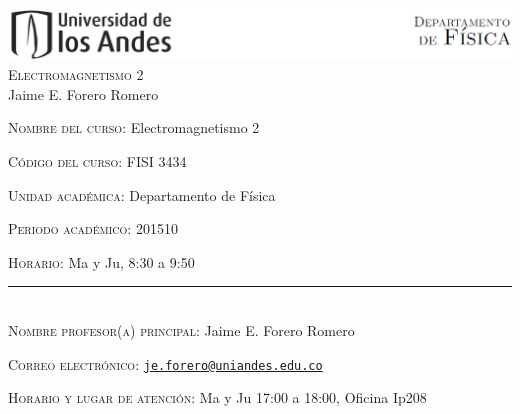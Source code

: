 \documentclass[letterpaper,10pt,onecolumn]{article}
\begin{document}
\begin{center}

\includegraphics[width=490pt]{header.png}\\[0.5cm]

\textsc{\LARGE Electromagnetismo 2}\\[0.1cm]

\large Jaime E. Forero Romero\\[0.5cm]

\end{center}

\large \noindent\textsc{Nombre del curso:}  Electromagnetismo 2%
  
\noindent\textsc{C\'odigo del curso:} FISI 3434 %

\noindent\textsc{Unidad acad\'emica:} Departamento de F\'isica

\noindent\textsc{Periodo acad\'emico:} 201510 %

\noindent\textsc{Horario:} Ma y Ju, 8:30 a 9:50%

\noindent\rule{\textwidth}{1pt}\\[-0.3cm]

\normalsize \noindent\textsc{Nombre profesor(a) principal:} Jaime
E. Forero Romero%

\noindent\textsc{Correo electr\'onico:}
\href{mailto:je.forero@uniandes.edu.co}{\nolinkurl{je.forero@uniandes.edu.co}}

\noindent\textsc{Horario y lugar de atenci\'on:} Ma y Ju 17:00 a
18:00, Oficina Ip208 %


\end{document}
